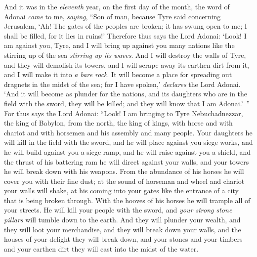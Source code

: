 \begin{biblechapter} %
 And it was in the \textit{eleventh} year, on the first day of the month, the word of Adonai \textit{came} to me, \textit{saying},
\verse “Son of man, because Tyre said concerning Jerusalem, ‘Ah! The gates of the peoples are broken; it has swung open to me; I shall be filled, for it lies in ruins!’
\verse Therefore thus says the Lord Adonai: ‘Look! I am against you, Tyre, and I will bring up against you many nations like the stirring up of the sea \textit{stirring up its waves}.
\verse And I will destroy the walls of Tyre, and they will demolish its towers, and I will scrape away its earthen dirt from it, and I will make it into \textit{a bare rock}.
\verse It will become a place for spreading out dragnets in the midst of the sea; for I have spoken,’ \textit{declares} the Lord Adonai. ‘And it will become as plunder for the nations,
\verse and its daughters who are in the field with the sword, they will be killed; and they will know that I am Adonai.’ ”
\verse For thus says the Lord Adonai: “Look! I am bringing to Tyre Nebuchadnezzar, the king of Babylon, from the north, the king of kings, with horse and with chariot and with horsemen and his assembly and many people.
\verse Your daughters he will kill in the field with the sword, and he will place against you siege works, and he will build against you a siege ramp, and he will raise against you a shield,
\verse and the thrust of his battering ram he will direct against your walls, and your towers he will break down with his weapons.
\verse From the abundance of his horses he will cover you with their fine dust; at the sound of horseman and wheel and chariot your walls will shake, at his coming into your gates like the entrance of a city that is being broken through.
\verse With the hooves of his horses he will trample all of your streets. He will kill your people with the sword, and \textit{your strong stone pillars} will tumble down to the earth.
\verse And they will plunder your wealth, and they will loot your merchandise, and they will break down your walls, and the houses of your delight they will break down, and your stones and your timbers and your earthen dirt they will cast into the midst of the water.

\end{biblechapter}

